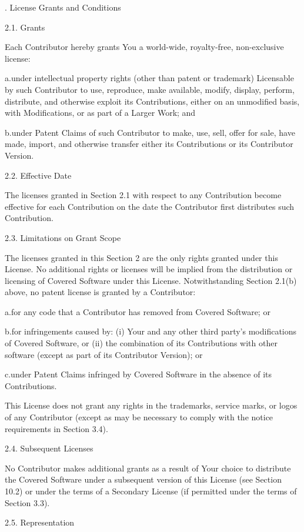 . License Grants and Conditions

2.1. Grants

Each Contributor hereby grants You a world-wide, royalty-free, non-exclusive license:

a.under intellectual property rights (other than patent or trademark) Licensable by such Contributor to use, reproduce, make available, modify, display, perform, distribute, and otherwise exploit its Contributions, either on an unmodified basis, with Modifications, or as part of a Larger Work; and

b.under Patent Claims of such Contributor to make, use, sell, offer for sale, have made, import, and otherwise transfer either its Contributions or its Contributor Version.

2.2. Effective Date

The licenses granted in Section 2.1 with respect to any Contribution become effective for each Contribution on the date the Contributor first distributes such Contribution.

2.3. Limitations on Grant Scope

The licenses granted in this Section 2 are the only rights granted under this License. No additional rights or licenses will be implied from the distribution or licensing of Covered Software under this License. Notwithstanding Section 2.1(b) above, no patent license is granted by a Contributor:

a.for any code that a Contributor has removed from Covered Software; or

b.for infringements caused by: (i) Your and any other third party’s modifications of Covered Software, or (ii) the combination of its Contributions with other software (except as part of its Contributor Version); or

c.under Patent Claims infringed by Covered Software in the absence of its Contributions.

This License does not grant any rights in the trademarks, service marks, or logos of any Contributor (except as may be necessary to comply with the notice requirements in Section 3.4).

2.4. Subsequent Licenses

No Contributor makes additional grants as a result of Your choice to distribute the Covered Software under a subsequent version of this License (see Section 10.2) or under the terms of a Secondary License (if permitted under the terms of Section 3.3).

2.5. Representation

